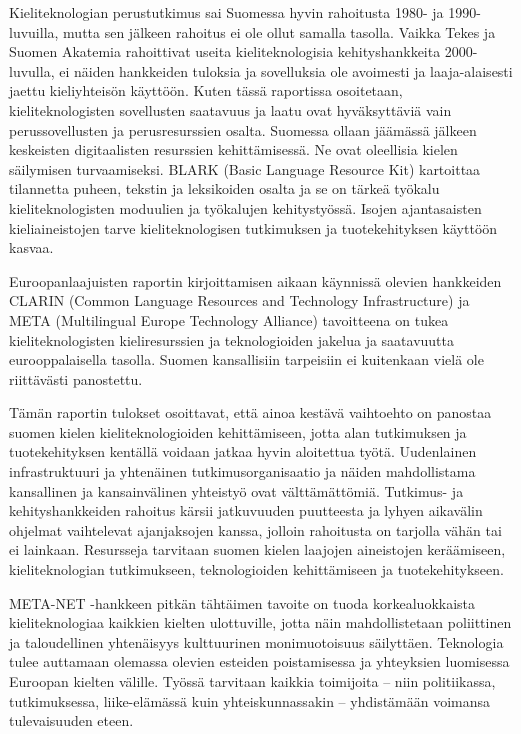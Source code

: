 \begin{multicols}{2}
Kieliteknologian perustutkimus sai Suomessa hyvin rahoitusta 1980- ja 1990-luvuilla, mutta sen jälkeen rahoitus ei ole ollut samalla tasolla. Vaikka Tekes ja Suomen Akatemia rahoittivat useita kieliteknologisia kehityshankkeita 2000-luvulla, ei näiden hankkeiden tuloksia ja sovelluksia ole avoimesti ja laaja-alaisesti jaettu kieliyhteisön käyttöön. Kuten tässä raportissa osoitetaan, kieliteknologisten sovellusten saatavuus ja laatu ovat hyväksyttäviä vain perussovellusten ja perusresurssien osalta. Suomessa ollaan jäämässä jälkeen keskeisten digitaalisten resurssien kehittämisessä. Ne ovat oleellisia kielen säilymisen turvaamiseksi. BLARK (Basic Language Resource Kit) kartoittaa tilannetta puheen, tekstin ja leksikoiden osalta ja se on tärkeä työkalu kieliteknologisten moduulien ja työkalujen kehitystyössä. Isojen ajantasaisten kieliaineistojen tarve kieliteknologisen tutkimuksen ja tuotekehityksen käyttöön kasvaa.

Euroopanlaajuisten raportin kirjoittamisen aikaan käynnissä olevien hankkeiden CLARIN (Common Language Resources and Technology Infrastructure) ja META (Multilingual Europe Technology Alliance) tavoitteena on tukea kieliteknologisten kieliresurssien ja teknologioiden jakelua ja saatavuutta eurooppalaisella tasolla. Suomen kansallisiin tarpeisiin ei kuitenkaan vielä ole riittävästi panostettu.

Tämän raportin tulokset osoittavat, että ainoa kestävä vaihtoehto on panostaa suomen kielen kieliteknologioiden kehittämiseen, jotta alan tutkimuksen ja tuotekehityksen kentällä voidaan jatkaa hyvin aloitettua työtä. Uudenlainen infrastruktuuri ja yhtenäinen tutkimusorganisaatio ja näiden mahdollistama kansallinen ja kansainvälinen yhteistyö ovat välttämättömiä. Tutkimus- ja kehityshankkeiden rahoitus kärsii jatkuvuuden puutteesta ja lyhyen aikavälin ohjelmat vaihtelevat ajanjaksojen kanssa, jolloin rahoitusta on tarjolla vähän tai ei lainkaan. Resursseja tarvitaan suomen kielen laajojen aineistojen keräämiseen, kieliteknologian tutkimukseen, teknologioiden kehittämiseen ja tuotekehitykseen.

META-NET -hankkeen pitkän tähtäimen tavoite on tuoda korkealuokkaista kieliteknologiaa kaikkien kielten ulottuville, jotta näin mahdollistetaan poliittinen ja taloudellinen yhtenäisyys kulttuurinen monimuotoisuus säilyttäen. Teknologia tulee auttamaan olemassa olevien esteiden poistamisessa ja yhteyksien luomisessa Euroopan kielten välille. Työssä tarvitaan kaikkia toimijoita – niin politiikassa, tutkimuksessa, liike-elämässä kuin yhteiskunnassakin – yhdistämään voimansa tulevaisuuden eteen.  
\end{multicols}

